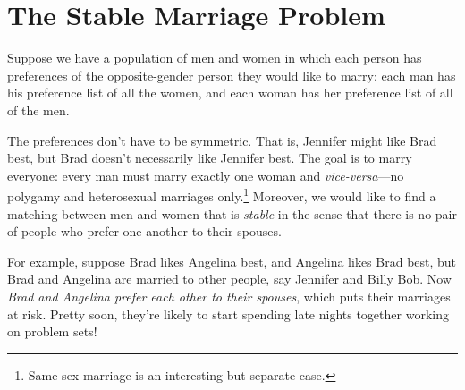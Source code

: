 \begin{problems}

\practiceproblems
{}

\homeworkproblems
{}


\classproblems
{}

\examproblems
{}
\end{problems}


\section{The Stable Marriage Problem}
\label{stablemarriagesec}
Suppose we have a population of men and women in which each person has
preferences of the opposite-gender person they would like to marry:
each man has his preference list of all the women, and each woman has
her preference list of all of the men.

The preferences don't have to be symmetric.  That is, Jennifer might
like Brad best, but Brad doesn't necessarily like Jennifer best.  The
goal is to marry everyone: every man must marry exactly one woman and
\emph{vice-versa}---no polygamy and heterosexual marriages
only.\footnote{Same-sex marriage is an interesting but separate case.}
Moreover, we would like to find a
matching between men and women that is \emph{stable} in the sense that
there is no pair of people who prefer one another to their spouses.

For example, suppose Brad likes Angelina best, and Angelina likes Brad
best, but Brad and Angelina are married to other people, say Jennifer
and Billy Bob.  Now \emph{Brad and Angelina prefer each other to their
  spouses}, which puts their marriages at risk.  Pretty soon, they're
likely to start spending late nights together working on problem sets!


